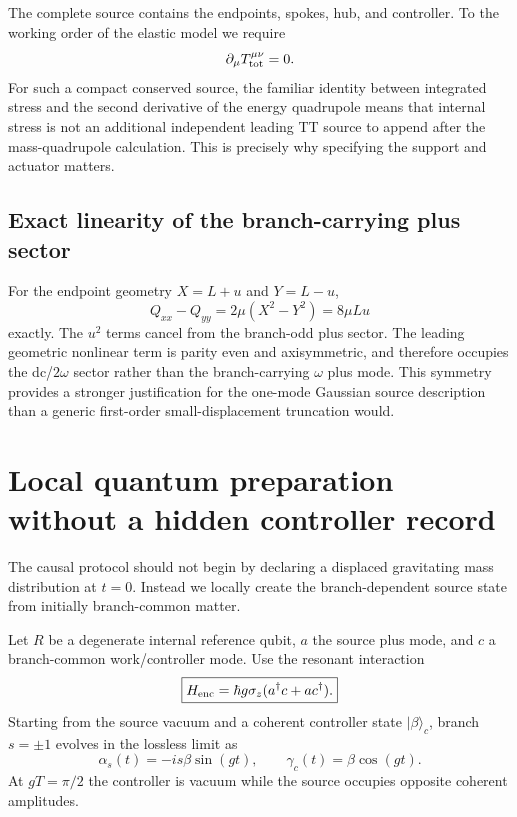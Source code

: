 \documentclass[11pt]{article}
\begin{document}
The complete source contains the endpoints, spokes, hub, and controller. To the working order of the elastic model we require
\begin{equation}
\partial_\mu T_{\rm tot}^{\mu\nu}=0.
\end{equation}
For such a compact conserved source, the familiar identity between integrated stress and the second derivative of the energy quadrupole means that internal stress is not an additional independent leading TT source to append after the mass-quadrupole calculation. This is precisely why specifying the support and actuator matters.

\subsection{Exact linearity of the branch-carrying plus sector}

For the endpoint geometry $X=L+u$ and $Y=L-u$,
\begin{equation}
Q_{xx}-Q_{yy}
=2\mu(X^2-Y^2)
=8\mu Lu
\end{equation}
exactly. The $u^2$ terms cancel from the branch-odd plus sector. The leading geometric nonlinear term is parity even and axisymmetric, and therefore occupies the dc/$2\omega$ sector rather than the branch-carrying $\omega$ plus mode. This symmetry provides a stronger justification for the one-mode Gaussian source description than a generic first-order small-displacement truncation would.

\section{Local quantum preparation without a hidden controller record}
\label{sec:encoder}

The causal protocol should not begin by declaring a displaced gravitating mass distribution at $t=0$. Instead we locally create the branch-dependent source state from initially branch-common matter.

Let $R$ be a degenerate internal reference qubit, $a$ the source plus mode, and $c$ a branch-common work/controller mode. Use the resonant interaction
\begin{equation}
\boxed{
H_{\rm enc}
=\hbar g\sigma_z(a^\dagger c+a c^\dagger).
}
\label{eq:encoder-H}
\end{equation}
Starting from the source vacuum and a coherent controller state $|\beta\rangle_c$, branch $s=\pm1$ evolves in the lossless limit as
\begin{equation}
\alpha_s(t)=-is\beta\sin(gt),
\qquad
\gamma_c(t)=\beta\cos(gt).
\end{equation}
At $gT=\pi/2$ the controller is vacuum while the source occupies opposite coherent amplitudes.
\end{document}
